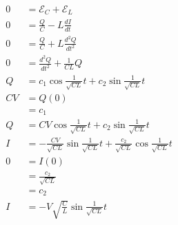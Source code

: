 \documentclass{article}
\begin{document}
\begin{align*}
  0   & = \mathcal{E}_C + \mathcal{E}_L                                                                            \\
  0   & = \frac{Q}{C} - L \frac{d I}{d t}                                                                          \\
  0   & = \frac{Q}{C} + L \frac{d^2 Q}{d t^2}                                                                      \\
  0   & = \frac{d^2 Q}{d t^2} + \frac{1}{C L} Q                                                                    \\
  Q   & = c_1 \cos \frac{1}{\sqrt{C L}} t + c_2 \sin \frac{1}{\sqrt{C L}} t                                        \\
  C V & = Q(0)                                                                                                     \\
      & = c_1                                                                                                      \\
  Q   & = C V \cos \frac{1}{\sqrt{C L}} t + c_2 \sin \frac{1}{\sqrt{C L}} t                                        \\
  I   & = -\frac{C V}{\sqrt{C L}} \sin \frac{1}{\sqrt{C L}} t + \frac{c_2}{\sqrt{C L}} \cos \frac{1}{\sqrt{C L}} t \\
  0   & = I(0)                                                                                                     \\
      & = \frac{c_2}{\sqrt{C L}}                                                                                   \\
      & = c_2                                                                                                      \\
  I   & = -V \sqrt{\frac{C}{L}} \sin \frac{1}{\sqrt{C L}} t
\end{align*}

\setcounter{subsection}{27}
\subsection{}
\end{document}
